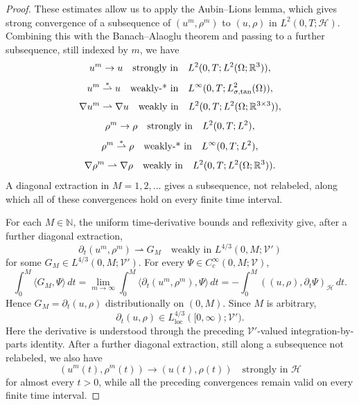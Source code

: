 \documentclass[11pt,reqno]{amsart}
\theoremstyle{plain}
\numberwithin{equation}{section}
\begin{document}
\begin{proof}
These estimates allow us to apply the Aubin--Lions lemma, which gives strong convergence of a subsequence of $(u^m,\rho^m)$ to $(u,\rho)$ in $L^2(0,T;\mathcal H)$. Combining this with the Banach--Alaoglu theorem and passing to a further subsequence, still indexed by \(m\), we have
\[
u^m\rightarrow u \text{\quad strongly in\quad} L^2(0,T;L^2(\Omega;\mathbb R^3)),
\]
\[
u^m\overset{\ast}{\rightharpoonup} u \text{\quad weakly-* in\quad} L^\infty(0,T;L^2_{\sigma,\tan}(\Omega)),
\]
\[
\nabla u^m\rightharpoonup \nabla u \text{\quad weakly in\quad} L^2(0,T;L^2(\Omega;\mathbb R^{3\times3})),
\]
\[
\rho^m\rightarrow \rho \text{\quad strongly in\quad} L^2(0,T;L^2),
\]
\[
\rho^m\overset{\ast}{\rightharpoonup} \rho\text{\quad weakly-* in\quad} L^\infty(0,T;L^2),
\]
\[
\nabla\rho^m\rightharpoonup \nabla\rho \text{\quad weakly in\quad} L^2(0,T;L^2(\Omega;\mathbb R^3)).
\]
A diagonal extraction in $M=1,2,\dots$ gives a subsequence, not relabeled,
along which all of these convergences hold on every finite time interval.

{For each \(M\in\mathbb N\), the uniform
time-derivative bounds and reflexivity give, after a further diagonal
extraction,}
\[
{
\partial_t(u^m,\rho^m)\rightharpoonup G_M
\quad\text{weakly in }L^{4/3}(0,M;\mathcal V')}
\]
{for some
\(G_M\in L^{4/3}(0,M;\mathcal V')\). For every
\(\Psi\in C_c^\infty(0,M;\mathcal V)\),}
\[
{
\int_0^M\langle G_M,\Psi\rangle\,dt
=
\lim_{m\to\infty}
\int_0^M\langle\partial_t(u^m,\rho^m),\Psi\rangle\,dt
=
-\int_0^M((u,\rho),\partial_t\Psi)_{\mathcal H}\,dt.}
\]
Hence
\(G_M=\partial_t(u,\rho)\) distributionally on \((0,M)\). Since \(M\) is
arbitrary,
\[
{
\partial_t(u,\rho)\in
L^{4/3}_{\mathrm{loc}}([0,\infty);\mathcal V').}
\]
Here the derivative is understood through the preceding
\(\mathcal V'\)-valued integration-by-parts identity.
After a further diagonal extraction, still along a subsequence not relabeled,
we also have
\[
{
(u^m(t),\rho^m(t))\longrightarrow(u(t),\rho(t))
\quad\text{strongly in }\mathcal H}
\]
{for almost every \(t>0\), while all the preceding convergences remain valid
on every finite time interval.}


\end{proof}
\end{document}
